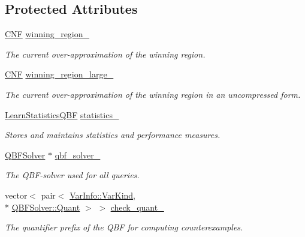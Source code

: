 \subsection*{Protected Attributes}
\begin{DoxyCompactItemize}
\item 
\hyperlink{classCNF}{C\-N\-F} \hyperlink{classLearnSynthQBF_a9c6b41f7df5f4ed4bfc5930136fc1152}{winning\-\_\-region\-\_\-}
\begin{DoxyCompactList}\small\item\em The current over-\/approximation of the winning region. \end{DoxyCompactList}\item 
\hyperlink{classCNF}{C\-N\-F} \hyperlink{classLearnSynthQBF_aa9b460cdc140c3969a32ea77982181d2}{winning\-\_\-region\-\_\-large\-\_\-}
\begin{DoxyCompactList}\small\item\em The current over-\/approximation of the winning region in an uncompressed form. \end{DoxyCompactList}\item 
\hyperlink{classLearnStatisticsQBF}{Learn\-Statistics\-Q\-B\-F} \hyperlink{classLearnSynthQBF_a85c46943042fdcfd672ce2251ef49cd9}{statistics\-\_\-}
\begin{DoxyCompactList}\small\item\em Stores and maintains statistics and performance measures. \end{DoxyCompactList}\item 
\hyperlink{classQBFSolver}{Q\-B\-F\-Solver} $\ast$ \hyperlink{classLearnSynthQBF_a8b4c4279f543a0adea992fccf22009f4}{qbf\-\_\-solver\-\_\-}
\begin{DoxyCompactList}\small\item\em The Q\-B\-F-\/solver used for all queries. \end{DoxyCompactList}\item 
vector$<$ pair$<$ \hyperlink{classVarInfo_a64d1da76cf84fe674e5fef9764ef11cf}{Var\-Info\-::\-Var\-Kind}, \\*
\hyperlink{classQBFSolver_ac091e263cb55286cc07b2451bcf4d3c7}{Q\-B\-F\-Solver\-::\-Quant} $>$ $>$ \hyperlink{classLearnSynthQBF_afafe15fef745bb97ac36741cbe00d4c1}{check\-\_\-quant\-\_\-}
\begin{DoxyCompactList}\small\item\em The quantifier prefix of the Q\-B\-F for computing counterexamples. \end{DoxyCompactList}\item 

\end{DoxyCompactItemize}
